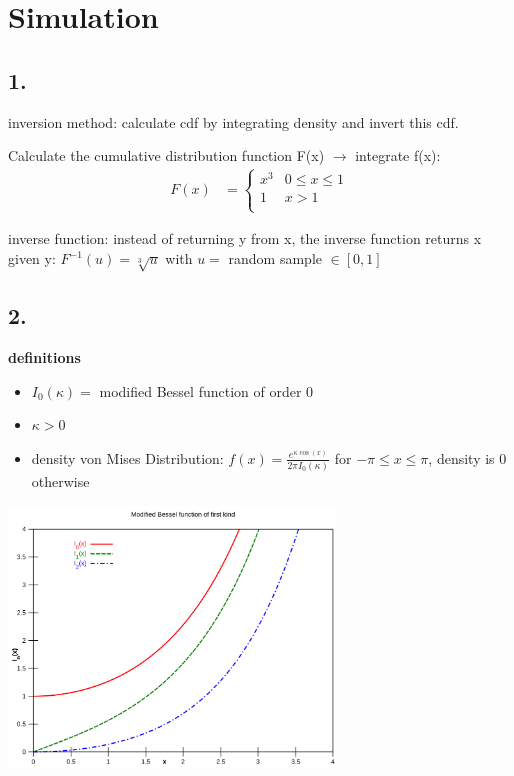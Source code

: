 \section{ Simulation }

\subsection*{ 1. }

inversion method: calculate cdf by integrating density and invert this cdf.

Calculate the cumulative distribution function F(x) $\rightarrow $ integrate f(x):
\begin{align*}
F\left(x\right)&=\begin{cases}
x^{3}&0\le x\le 1\\
1&x> 1\\
\end{cases}
\end{align*}

inverse function: instead of returning y from x, the inverse function returns x given y: $F^{{-1}}\left(u\right)=\sqrt[3]{u}$ with $u=$ random sample $\in \left[0,1\right]$

\subsection*{ 2. }

\textbf{definitions}

\begin{itemize}
\item  $I_{0}\left(\kappa \right)=$ modified Bessel function of order 0
\item  $\kappa > 0$
\item  density von Mises Distribution: $f\left(x\right)=\frac{e^{{\kappa \cos \left(x\right)}}}{2\pi I_{0}\left(\kappa \right)}$ for $-\pi \le x\le \pi $, density is 0 otherwise
\end{itemize}

\includegraphics[width=0.65\textwidth]{pics/simulation_2_bessel.png}


